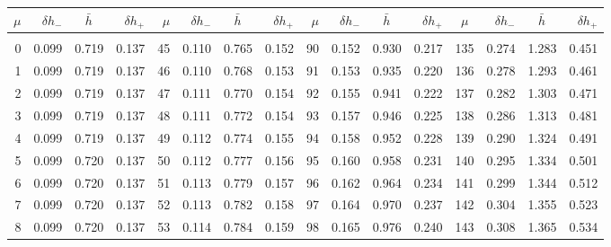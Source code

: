 \newpage
\begin{table}\centering
\small{ \begin{tabular}{rrrr|rrrr|rrrr|crrr}
$\mu$ & $\delta h_-$  & $\bar{h}~~~~$ & $\delta h_+$ &
$\mu$ & $\delta h_-$  & $\bar{h}~~~~$ & $\delta h_+$ &
$\mu$ & $\delta h_-$  & $\bar{h}~~~~$ & $\delta h_+$ &
$\mu$ & $\delta h_-$  & $\bar{h}~~~~$ & $\delta h_+$ \\\hline
&&&&&&&&&&&&&&&\\[-1.75ex]
  0 & \tiny{  0.099} &   0.719 & \tiny{  0.137} &  45 & \tiny{  0.110} &   0.765 & \tiny{  0.152} &  90 & \tiny{  0.152} &   0.930 & \tiny{  0.217} & 135 & \tiny{  0.274} &   1.283 & \tiny{  0.451}\\
  1 & \tiny{  0.099} &   0.719 & \tiny{  0.137} &  46 & \tiny{  0.110} &   0.768 & \tiny{  0.153} &  91 & \tiny{  0.153} &   0.935 & \tiny{  0.220} & 136 & \tiny{  0.278} &   1.293 & \tiny{  0.461}\\
  2 & \tiny{  0.099} &   0.719 & \tiny{  0.137} &  47 & \tiny{  0.111} &   0.770 & \tiny{  0.154} &  92 & \tiny{  0.155} &   0.941 & \tiny{  0.222} & 137 & \tiny{  0.282} &   1.303 & \tiny{  0.471}\\
  3 & \tiny{  0.099} &   0.719 & \tiny{  0.137} &  48 & \tiny{  0.111} &   0.772 & \tiny{  0.154} &  93 & \tiny{  0.157} &   0.946 & \tiny{  0.225} & 138 & \tiny{  0.286} &   1.313 & \tiny{  0.481}\\
  4 & \tiny{  0.099} &   0.719 & \tiny{  0.137} &  49 & \tiny{  0.112} &   0.774 & \tiny{  0.155} &  94 & \tiny{  0.158} &   0.952 & \tiny{  0.228} & 139 & \tiny{  0.290} &   1.324 & \tiny{  0.491}\\
  5 & \tiny{  0.099} &   0.720 & \tiny{  0.137} &  50 & \tiny{  0.112} &   0.777 & \tiny{  0.156} &  95 & \tiny{  0.160} &   0.958 & \tiny{  0.231} & 140 & \tiny{  0.295} &   1.334 & \tiny{  0.501}\\
  6 & \tiny{  0.099} &   0.720 & \tiny{  0.137} &  51 & \tiny{  0.113} &   0.779 & \tiny{  0.157} &  96 & \tiny{  0.162} &   0.964 & \tiny{  0.234} & 141 & \tiny{  0.299} &   1.344 & \tiny{  0.512}\\
  7 & \tiny{  0.099} &   0.720 & \tiny{  0.137} &  52 & \tiny{  0.113} &   0.782 & \tiny{  0.158} &  97 & \tiny{  0.164} &   0.970 & \tiny{  0.237} & 142 & \tiny{  0.304} &   1.355 & \tiny{  0.523}\\
  8 & \tiny{  0.099} &   0.720 & \tiny{  0.137} &  53 & \tiny{  0.114} &   0.784 & \tiny{  0.159} &  98 & \tiny{  0.165} &   0.976 & \tiny{  0.240} & 143 & \tiny{  0.308} &   1.365 & \tiny{  0.534}\\

\end{tabular}}
\end{table}
